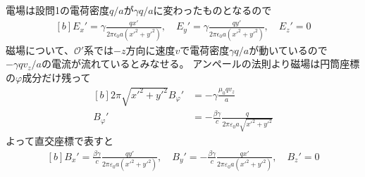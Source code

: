 \documentclass[../../sp_2014.tex]{subfiles}
\begin{document}
\subsection{}
電場は設問1の電荷密度\(q/a\)が\(\gamma q/a\)に変わったものとなるので
\begin{equation}\begin{aligned}[b]
    E_x' =\gamma \frac{qx'}{2\pi\epsilon_0a(x'^2+y'^2)},\quad
    E_y' =\gamma \frac{qy'}{2\pi\epsilon_0a(x'^2+y'^2)},\quad
    E_z' = 0
\end{aligned}\end{equation}
磁場について、\(\mathcal{O}'\)系では\(-z\)方向に速度\(v\)で電荷密度\(\gamma q/a\)が動いているので
\(-\gamma qv_z/a\)の電流が流れているとみなせる。
アンペールの法則より磁場は円筒座標の\(\varphi\)成分だけ残って
\begin{equation}\begin{aligned}[b]
    2\pi\sqrt{x'^2+y'^2}B_\varphi' &= -\gamma\frac{\mu_0qv_z}{a}\\
    B_\varphi' &= -\frac{\beta\gamma}{c}\frac{q}{2\pi\varepsilon_0 a\sqrt{x'^2+y'^2}}
\end{aligned}\end{equation}
よって直交座標で表すと
\begin{equation}\begin{aligned}[b]
    B_x' = \frac{\beta\gamma}{c}\frac{q y'}{2\pi\varepsilon_0 a(x'^2+y'^2)},\quad
    B_y' = -\frac{\beta\gamma}{c}\frac{q x'}{2\pi\varepsilon_0 a(x'^2+y'^2)},\quad
    B_z' = 0
\end{aligned}\end{equation}
\end{document}
